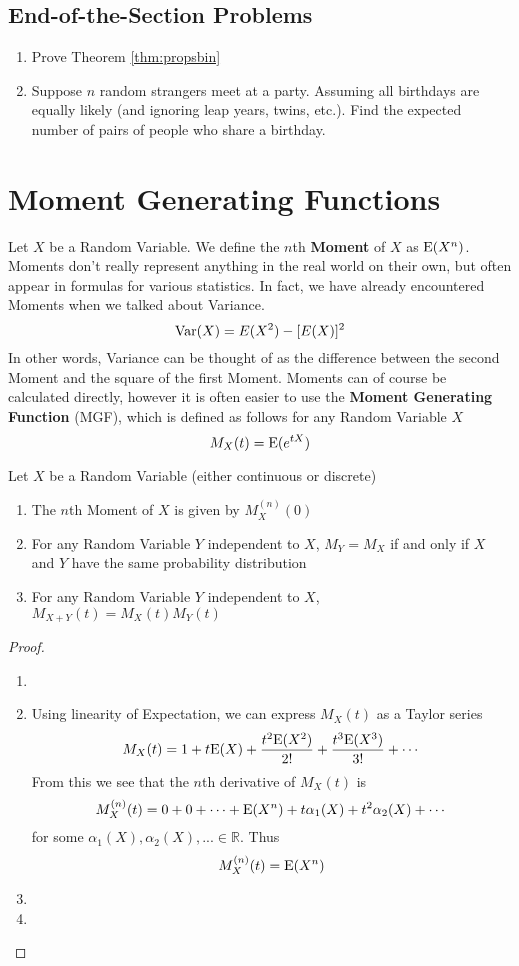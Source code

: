 \documentclass{report}
\begin{document}
\subsection{End-of-the-Section Problems}
\begin{enumerate}
    \item Prove Theorem \ref{thm:propsbin}
    \item Suppose $n$ random strangers meet at a party. Assuming all birthdays are equally likely (and ignoring leap years, twins, etc.). Find the expected number of pairs of people who share a birthday. 
\end{enumerate}


\section{Moment Generating Functions}
Let $X$ be a Random Variable. We define the $n$th \textbf{Moment} of $X$ as $\textup{E}(X^n)$. Moments don't really represent anything in the real world on their own, but often appear in formulas for various statistics. In fact, we have already encountered Moments when we talked about Variance.
\[
    \textup{Var}(X)=E(X^2)-[E(X)]^2
\]
In other words, Variance can be thought of as the difference between the second Moment and the square of the first Moment. Moments can of course be calculated directly, however it is often easier to use the \textbf{Moment Generating Function} (MGF), which is defined as follows for any Random Variable $X$
\[
    M_X(t)=\textup{E}(e^{tX})
\]
\begin{theorem}
    Let $X$ be a Random Variable (either continuous or discrete)
    \begin{enumerate}
        \item The $n$th Moment of $X$ is given by $M_X^{(n)}(0)$
        \item For any Random Variable $Y$ independent to $X$, $M_Y=M_X$ if and only if $X$ and $Y$ have the same probability distribution
        \item For any Random Variable $Y$ independent to $X$, $M_{X+Y}(t)=M_X(t)M_Y(t)$
    \end{enumerate}
    \begin{proof}
        \begin{enumerate}
            \item[]
            \item Using linearity of Expectation, we can express $M_X(t)$ as a Taylor series
            \[
                M_X(t)=1+t\textup{E}(X)+\frac{t^2\textup{E}(X^2)}{2!} + \frac{t^3\textup{E}(X^3)}{3!} + \cdots 
            \]
            From this we see that the $n$th derivative of $M_X(t)$ is
            \[
                M_X^{(n)}(t)=0+0+\cdots+\textup{E}(X^n)+ t\alpha_1(X) + t^2 \alpha_2(X) + \cdots
            \]
            for some $\alpha_1(X), \alpha_2(X),...\in\mathbb R$. Thus
            \[
                M_X^{(n)}(t)=\textup{E}(X^n)
            \]
            \item\todo
            \item\todo
        \end{enumerate}
    \end{proof}
\end{theorem}
\label{thm:mgfprops}
\end{document}
